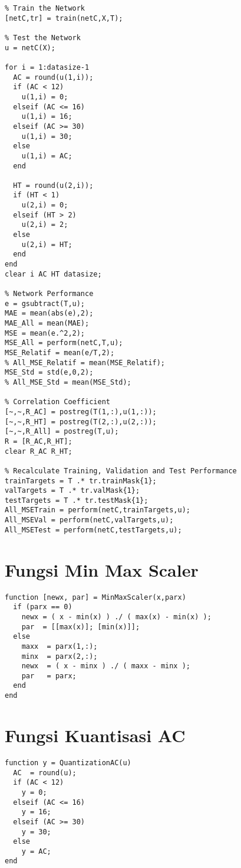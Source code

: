 \begin{lstlisting}
% Train the Network
[netC,tr] = train(netC,X,T);

% Test the Network
u = netC(X);

for i = 1:datasize-1
  AC = round(u(1,i));
  if (AC < 12)
    u(1,i) = 0;
  elseif (AC <= 16)
    u(1,i) = 16;
  elseif (AC >= 30)
    u(1,i) = 30;    
  else
    u(1,i) = AC;
  end

  HT = round(u(2,i));
  if (HT < 1)
    u(2,i) = 0;
  elseif (HT > 2)
    u(2,i) = 2;
  else
    u(2,i) = HT;
  end
end
clear i AC HT datasize;

% Network Performance
e = gsubtract(T,u);
MAE = mean(abs(e),2);
MAE_All = mean(MAE);
MSE = mean(e.^2,2);
MSE_All = perform(netC,T,u);
MSE_Relatif = mean(e/T,2);
% All_MSE_Relatif = mean(MSE_Relatif);
MSE_Std = std(e,0,2);
% All_MSE_Std = mean(MSE_Std);

% Correlation Coefficient
[~,~,R_AC] = postreg(T(1,:),u(1,:));
[~,~,R_HT] = postreg(T(2,:),u(2,:));
[~,~,R_All] = postreg(T,u);
R = [R_AC,R_HT];
clear R_AC R_HT;

% Recalculate Training, Validation and Test Performance
trainTargets = T .* tr.trainMask{1};
valTargets = T .* tr.valMask{1};
testTargets = T .* tr.testMask{1};
All_MSETrain = perform(netC,trainTargets,u);
All_MSEVal = perform(netC,valTargets,u);
All_MSETest = perform(netC,testTargets,u);
\end{lstlisting}
\hfill

\section{Fungsi Min Max Scaler}
\begin{lstlisting}
function [newx, par] = MinMaxScaler(x,parx)
  if (parx == 0)
    newx = ( x - min(x) ) ./ ( max(x) - min(x) );
    par  = [[max(x)]; [min(x)]];
  else
    maxx  = parx(1,:);
    minx  = parx(2,:);
    newx  = ( x - minx ) ./ ( maxx - minx );
    par   = parx;
  end
end
\end{lstlisting}
\hfill

\section{Fungsi Kuantisasi AC}
\begin{lstlisting}
function y = QuantizationAC(u)
  AC  = round(u);
  if (AC < 12)
    y = 0;
  elseif (AC <= 16)
    y = 16;
  elseif (AC >= 30)
    y = 30;
  else
    y = AC;
end
\end{lstlisting}
\hfill

